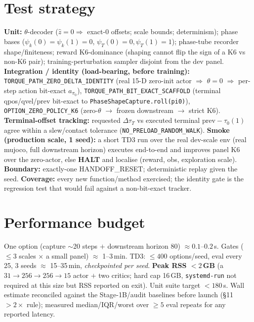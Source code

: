 \documentclass[11pt]{article}
\newcommand{\code}[1]{\texttt{\small #1}}
\newcommand{\halt}{\textcolor{red!70!black}{\textbf{HALT}}}
\begin{document}
\section{Test strategy}
\textbf{Unit:} $\theta$-decoder ($\hat z{=}0\Rightarrow$ exact-$0$ offsets; scale bounds; determinism); phase bases
($\psi_k(0){=}\psi_k(1){=}0$, $\psi_T(0){=}0,\psi_T(1){=}1$); phase-tube recorder shape/finiteness; reward K6-dominance
(shaping cannot flip the sign of a K6 vs non-K6 pair); training-perturbation sampler disjoint from the dev panel.
\textbf{Integration / identity (load-bearing, before training):}
\code{TORQUE\_PATH\_ZERO\_DELTA\_IDENTITY} (real 15-D zero-init actor $\Rightarrow$ $\theta{=}0$ $\Rightarrow$ per-step
action bit-exact $a_{\pi_0}$), \code{TORQUE\_PATH\_BIT\_EXACT\_SCAFFOLD} (terminal qpos/qvel/prev bit-exact to
\code{PhaseShapeCapture.roll(pi0)}), \code{OPTION\_ZERO\_POLICY\_K6} (zero-$\theta$ $\to$ frozen downstream $\to$ strict K6).
\textbf{Terminal-offset tracking:} requested $\Delta\tau_T$ vs executed terminal $\text{prev}-\tau_0(1)$ agree within a
slew/contact tolerance (\code{NO\_PRELOAD\_RANDOM\_WALK}). \textbf{Smoke (production scale, 1 seed):} a short TD3 run over the
real dev-scale env (real mujoco, full downstream horizon) executes end-to-end and improves panel K6 over the zero-actor,
else \halt{} and localise (reward, obs, exploration scale). \textbf{Boundary:} exactly-one HANDOFF\_RESET; deterministic
replay given the seed. \textbf{Coverage:} every new function/method exercised; the identity gate is the regression test that
would fail against a non-bit-exact tracker.

\section{Performance budget}
One option (capture $\sim$20 steps $+$ downstream horizon 80) $\approx 0.1$--$0.2$\,s. Gates ($\le3$ scales $\times$ a small
panel) $\approx$ 1--3\,min. TD3: $\le400$ options/seed, eval every 25, 3 seeds $\approx$ 15--35\,min, \emph{checkpointed per
seed}. \textbf{Peak RSS $<2$\,GB} (a $31{\to}256{\to}256{\to}15$ actor $+$ two critics; hard cap 16\,GB, \code{systemd-run}
not required at this size but RSS reported on exit). Unit suite target $<180$\,s. Wall estimate reconciled against the
Stage-1B/audit baselines before launch (\S11 $>2\times$ rule); measured median/IQR/worst over $\ge5$ eval repeats for any
reported latency.
\end{document}
